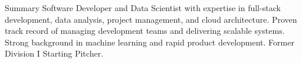\documentclass{resume3}
\begin{document}
\pagestyle{empty}



\vspace{-0.5cm}
\address{%
  267-753-5299 $\cdot$
  \href{mailto:mrabayda4@icloud.com}{mrabayda4@icloud.com} $\cdot$
  Philadelphia, PA $\cdot$
}
\vspace{-0.7cm}
\address{%
  \href{https://www.linkedin.com/in/michael-rabayda/}{\textcolor{blue}{\ linkedin.com/in/michael-rabayda}}
  \href{https://github.com/mikerabs}{\textcolor{blue}{\ github.com/mikerabs}}
  \href{https://www.mikerabayda.com/}{\textcolor{blue}{\ mikerabayda.com}}
  }
\vspace{-0.5cm}

\begin{rSection}{Summary}
\vspace{0.15cm}
Software Developer and Data Scientist with expertise in full-stack development, data analysis, project management, and cloud architecture. Proven track record of managing development teams and delivering scalable systems. Strong background in machine learning and rapid product development.  Former Division I Starting Pitcher.
\end{rSection}
\end{document}
